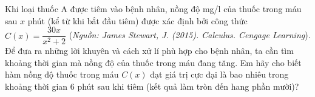 \begin{ex}%
Khi loại thuốc A được tiêm vào bệnh nhân, nồng độ mg/l của thuốc trong máu sau $x$ phút (kể từ khi bắt đầu tiêm) được xác định bởi công thức $C(x)=\dfrac{30x}{x^2+2}$
(\textit{Nguồn: James Stewart, J. (2015). Calculus. Cengage Learning}). Để đưa ra những lời khuyên và cách xử lí phù hợp cho bệnh nhân, ta cần tìm khoảng thời gian mà nồng độ của thuốc trong máu đang tăng. Em hãy cho biết hàm nồng độ
thuốc trong máu $C(x)$ đạt giá trị cực đại là bao nhiêu trong khoảng thời gian $6$ phút sau khi tiêm (kết quả làm tròn đến hang phần mười)?
\end{ex}
